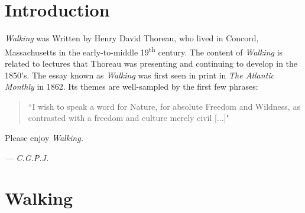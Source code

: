 \documentclass[twoside,openright,10pt]{memoir} %
\begin{document}
\chapter*{Introduction}
\setlength\parindent{0em}
\setlength\parskip{10pt}
\textit{Walking} was Written by Henry David Thoreau, who lived in Concord, Massachusetts in the early-to-middle 19\textsuperscript{th} century. The content of \textit{Walking} is related to lectures that Thoreau was presenting and continuing to develop in the 1850's. The essay known as \textit{Walking} was first seen in print in \textit{The Atlantic Monthly} in 1862. Its themes are well-sampled by the first few phrases:
\begin{quotation}
  \noindent “I wish to speak a word for Nature, for absolute Freedom and Wildness, as contrasted with a freedom and culture merely civil [...]"

\end{quotation}
Please enjoy \textit{Walking.}
\begin{flushright}
  \emph{— C.\thinspace G.\thinspace P.\thinspace J.\thinspace }
\end{flushright}

\chapter*{Walking}
\pagestyle{plain}
\setlength\parindent{1.5em}
\setlength\parskip{0\baselineskip}
\end{document}
